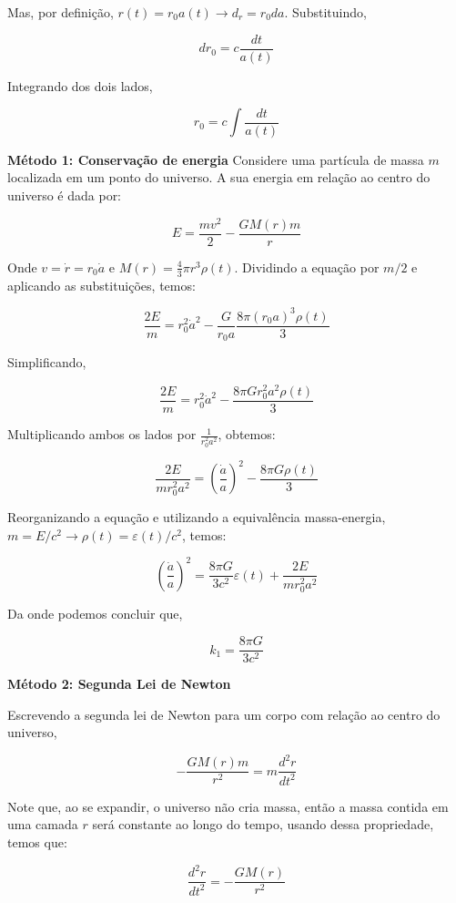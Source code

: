 \documentclass[11pt]{article}
\begin{document}
\begin{pproblem}
\begin{pssolution*}{}{ }
\begin{alternativas}
        Mas, por definição, \(r(t) = r_0 a(t) \rightarrow d_r = r_0 da\). Substituindo, 

        \[dr_0 = c\frac{dt}{a(t)}\]

        Integrando dos dois lados, 

        \[r_0 = c\int \frac{dt}{a(t)}\]

        \item \textbf{Método 1: Conservação de energia}
        Considere uma partícula de massa \(m\) localizada em um ponto do universo. A sua energia em relação ao centro do universo é dada por:

        \[E = \frac{mv^2}{2} - \frac{GM(r)m}{r}\]

        Onde \(v = \dot{r} = r_0 \dot{a}\) e \(M(r) = \frac{4}{3} \pi r^3 \rho(t)\). Dividindo a equação por \(m/2\) e aplicando as substituições, temos:

        \[\frac{2E}{m} = r_0^2 \dot{a}^2 - \frac{G}{r_0 a} \frac{8\pi (r_0 a)^3 \rho(t)}{3}\]

        Simplificando, 

        \[\frac{2E}{m} = r_0^2 \dot{a}^2 - \frac{8\pi G r_0^2 a^2 \rho(t)}{3}\]

        Multiplicando ambos os lados por \(\frac{1}{r_0^2 a^2}\), obtemos:

        \[\frac{2E}{mr_0^2 a^2} = \left(\frac{\dot{a}}{a}\right)^2 - \frac{8\pi G \rho(t)}{3}\]

        Reorganizando a equação e utilizando a equivalência massa-energia, \(m = E/c^2 \rightarrow \rho(t) = \varepsilon(t)/c^2\), temos:

        \[\left(\frac{\dot{a}}{a}\right)^2 = \frac{8\pi G}{3 c^2} \varepsilon(t) + \frac{2E}{mr_0^2 a^2}\]

        Da onde podemos concluir que,

        \[\boxed{k_1 = \frac{8\pi G}{3 c^2}}\]


        \textbf{Método 2: Segunda Lei de Newton}

        Escrevendo a segunda lei de Newton para um corpo com relação ao centro do universo,

        \[-\frac{GM(r)m}{r^2} = m \frac{d^2r}{dt^2}\]

        Note que, ao se expandir, o universo não cria massa, então a massa contida em uma camada \(r\) será constante ao longo do tempo, usando dessa propriedade, temos que:

        \[\frac{d^2r}{dt^2} = -\frac{GM(r)}{r^2}\]


\end{alternativas}
\end{pssolution*}
\end{pproblem}
\end{document}
